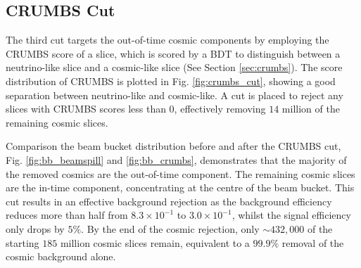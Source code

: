 \subsection{CRUMBS Cut}
\label{sec:cosmic_crumbs}

The third cut targets the out-of-time cosmic components by employing the CRUMBS score of a slice, which is scored by a BDT to distinguish between a neutrino-like slice and a cosmic-like slice (See Section \ref{sec:crumbs}). 
The score distribution of CRUMBS is plotted in Fig. \ref{fig:crumbs_cut}, showing a good separation between neutrino-like and cosmic-like.
A cut is placed to reject any slices with CRUMBS scores less than 0, effectively removing $14$ million of the remaining cosmic slices.

Comparison the beam bucket distribution before and after the CRUMBS cut, Fig. \ref{fig:bb_beamspill} and \ref{fig:bb_crumbs}, demonstrates that the majority of the removed cosmics are the out-of-time component. 
The remaining cosmic slices are the in-time component, concentrating at the centre of the beam bucket.  
This cut results in an effective background rejection as the background efficiency reduces more than half from $8.3 \times 10^{-1}$ to $3.0 \times 10^{-1}$, whilst the signal efficiency only drops by $5 \%$.
By the end of the cosmic rejection, only $\sim432,000$ of the starting $185$ million cosmic slices remain, equivalent to a $99.9\%$ removal of the cosmic background alone.

